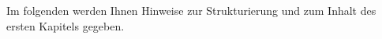 \begin{comment}
* Think about: what's the computer science take on the field? How can we design a "better"/more efficient/more user friendly system? A system that reflects particular values (vgl Code 2.0, Chapter 3, p.34)?
  * go over notes in the filter classification and think about interesting controversies, things that attract the attention
  * what are useful categories
  * GT is good for tackling controversial questions: e.g. are filters with disallow action a too severe interference with the editing process that has way too much negative consequences? (e.g. driving away new comers?)

* What can we study?
  * Question: Is it worth it to use a filter which has many side effects?
  * Do filters work the desired way/help for a smoother Wikipedia service or is it a lot of work to maintain them and the usefulness is questionable?
  * Precision/Recall: False Positives? were filters shut down, bc they matched more False positives than they had real value?
  * How has the notion of vandalism changed over time (not particularly computer sciency..)?
  * What are disallow/block filters doing? Is it too great an intervention that drives new editors away? (Can we answer that?)
  * Is it worth it to use a filter which has many side effects?
  * What are discussions on filter patterns? On filter repercussions?
  * What can we filter with a REGEX? And what not? Are regexes the suitable technology for the means the community is trying to achieve?
  * GT is good for tackling controversial questions: e.g. are filters with disallow action a too severe interference with the editing process that has way too much negative consequences? (e.g. driving away new comers?)

## TODO

* How can we improve it from a computer scientist's/engineer's perspective?
* What task do the edit filters try to solve? Why does this task exist?/Why is it important?
* Why are there mechanisms triggered befor an edit gets published (such as edit filters), and such triggered afterwards (such as bots)? Is there a qualitative difference?
* I want to help people to do their work better using a technical system (e.g. the edit filters). How can I do this?
* The edit filter system can be embedded in the vandalism prevention frame. Are there other contexts/frames for which it is relevant?
\end{comment}
Im folgenden werden Ihnen Hinweise zur Strukturierung und zum Inhalt des ersten Kapitels gegeben.

